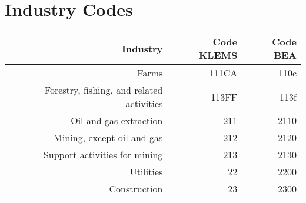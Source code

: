 
    \section{Industry Codes}\label{sec:industry_codes}
\begin{table}[H]
\begin{center}
\begin{tabular}{rrr}
Industry                                                             & Code KLEMS & Code BEA   \\%
\hline\hline
Farms                                                                & 111CA       & 110c      \\%
Forestry, fishing, and related activities                            & 113FF       & 113f      \\%
Oil and gas extraction                                               & 211         & 2110      \\%
Mining, except oil and gas                                           & 212         & 2120      \\%
Support activities for mining                                        & 213         & 2130      \\%
Utilities                                                            & 22          & 2200      \\%
Construction                                                         & 23          & 2300      \\%

\end{tabular}
\end{center}
\end{table}

